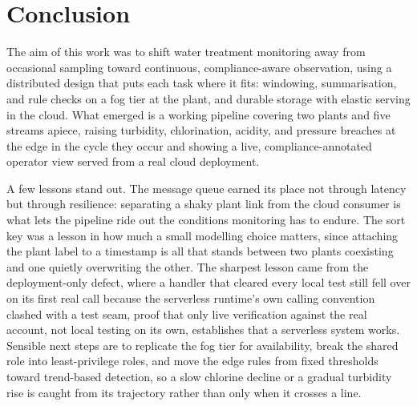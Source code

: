 \documentclass[conference]{IEEEtran}
\begin{document}
\section{Conclusion}

The aim of this work was to shift water treatment monitoring away from occasional sampling toward continuous, compliance-aware observation, using a distributed design that puts each task where it fits: windowing, summarisation, and rule checks on a fog tier at the plant, and durable storage with elastic serving in the cloud. What emerged is a working pipeline covering two plants and five streams apiece, raising turbidity, chlorination, acidity, and pressure breaches at the edge in the cycle they occur and showing a live, compliance-annotated operator view served from a real cloud deployment.

A few lessons stand out. The message queue earned its place not through latency but through resilience: separating a shaky plant link from the cloud consumer is what lets the pipeline ride out the conditions monitoring has to endure. The sort key was a lesson in how much a small modelling choice matters, since attaching the plant label to a timestamp is all that stands between two plants coexisting and one quietly overwriting the other. The sharpest lesson came from the deployment-only defect, where a handler that cleared every local test still fell over on its first real call because the serverless runtime's own calling convention clashed with a test seam, proof that only live verification against the real account, not local testing on its own, establishes that a serverless system works. Sensible next steps are to replicate the fog tier for availability, break the shared role into least-privilege roles, and move the edge rules from fixed thresholds toward trend-based detection, so a slow chlorine decline or a gradual turbidity rise is caught from its trajectory rather than only when it crosses a line.



\end{document}
